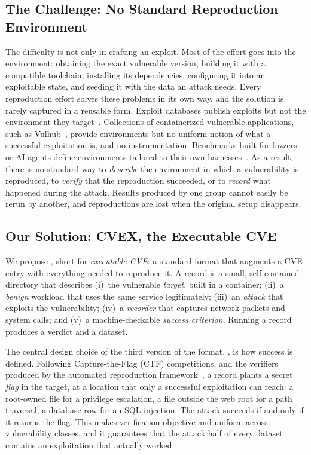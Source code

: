 \subsection{The Challenge: No Standard Reproduction Environment}

The difficulty is not only in crafting an exploit. Most of the effort goes
into the environment: obtaining the exact vulnerable version, building it
with a compatible toolchain, installing its dependencies, configuring it into
an exploitable state, and seeding it with the data an attack needs. Every
reproduction effort solves these problems in its own way, and the solution is
rarely captured in a reusable form. Exploit databases publish exploits but
not the environment they target~\cite{exploitdb}. Collections of
containerized vulnerable applications, such as Vulhub~\cite{vulhub}, provide
environments but no uniform notion of what a successful exploitation is, and
no instrumentation. Benchmarks built for fuzzers or AI agents define
environments tailored to their own harnesses~\cite{mei2026arvo,zhu2025cvebench,wang2026cybergym,lee2025secbench}.
As a result, there is no standard way to \emph{describe} the environment in
which a vulnerability is reproduced, to \emph{verify} that the reproduction
succeeded, or to \emph{record} what happened during the attack. Results
produced by one group cannot easily be rerun by another, and reproductions
are lost when the original setup disappears.

\subsection{Our Solution: CVEX, the Executable CVE}

We propose \cvex, short for \emph{executable CVE}: a standard format that
augments a CVE entry with everything needed to reproduce it. A \cvex record
is a small, self-contained directory that describes (i)~the vulnerable
\emph{target}, built in a container; (ii)~a \emph{benign} workload that uses
the same service legitimately; (iii)~an \emph{attack} that exploits the
vulnerability; (iv)~a \emph{recorder} that captures network packets and
system calls; and (v)~a machine-checkable \emph{success criterion}. Running a
record produces a verdict and a dataset.

The central design choice of the third version of the format, \cvexthree, is
how success is defined. Following Capture-the-Flag (CTF) competitions, and
the verifiers produced by the \genie automated reproduction
framework~\cite{ullah2026cvegenie}, a record plants a secret \emph{flag} in
the target, at a location that only a successful exploitation can reach: a
root-owned file for a privilege escalation, a file outside the web root for a
path traversal, a database row for an SQL injection. The attack succeeds if
and only if it returns the flag. This makes verification objective and
uniform across vulnerability classes, and it guarantees that the attack half
of every dataset contains an exploitation that actually worked.

